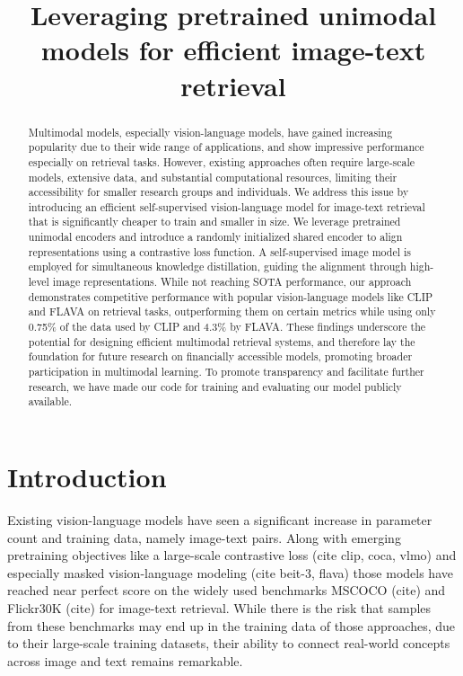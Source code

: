 \documentclass[10pt]{article} %
\title{Leveraging pretrained unimodal models for efficient image-text retrieval}
\begin{document}
\maketitle

\begin{abstract}
Multimodal models, especially vision-language models, have gained increasing popularity due to their wide range of applications,
and show impressive performance especially on retrieval tasks. However, existing approaches often require large-scale models,
extensive data, and substantial computational resources, limiting their accessibility for smaller research groups and individuals.
We address this issue by introducing an efficient self-supervised vision-language model for image-text retrieval that is significantly
cheaper to train and smaller in size. We leverage pretrained unimodal encoders and introduce a randomly initialized shared encoder to align
representations using a contrastive loss function. A self-supervised image model is employed for simultaneous knowledge distillation,
guiding the alignment through high-level image representations. While not reaching SOTA performance, our approach demonstrates competitive
performance with popular vision-language models like CLIP and FLAVA on retrieval tasks, outperforming them on certain metrics while using
only 0.75\% of the data used by CLIP and 4.3\% by FLAVA. These findings underscore the potential for designing efficient multimodal retrieval
systems, and therefore lay the foundation for future research on financially accessible models, promoting broader participation in multimodal
learning. To promote transparency and facilitate further research, we have made our code for training and evaluating our model publicly available.
\end{abstract}

\section{Introduction}
Existing vision-language models have seen a significant increase in parameter count and training data, namely image-text pairs.
Along with emerging pretraining objectives like a large-scale contrastive loss (cite clip, coca, vlmo) and especially masked
vision-language modeling (cite beit-3, flava) those models have reached near perfect score on the widely used benchmarks MSCOCO
(cite) and Flickr30K (cite) for image-text retrieval. While there is the risk that samples from these benchmarks may end up in
the training data of those approaches, due to their large-scale training datasets, their ability to connect real-world concepts
across image and text remains remarkable.
\end{document}
